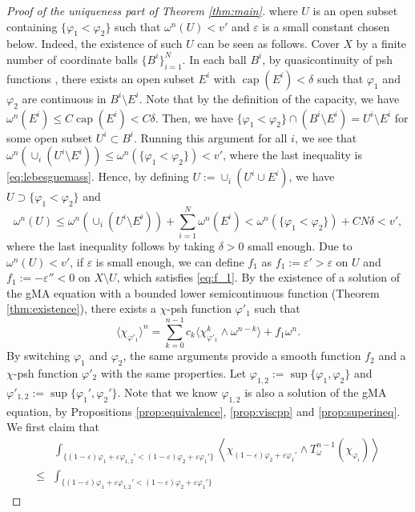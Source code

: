 \documentclass{amsart}
\numberwithin{equation}{section}
\theoremstyle{plain}
\theoremstyle{definition}
\theoremstyle{remark}
\begin{document}
\begin{proof}[Proof of the uniqueness part of Theorem \ref{thm:main}]
    where $U$ is an open subset containing $\{\varphi_1<\varphi_2\}$ such that $\omega^n(U)<v'$ and $\varepsilon$ is a small constant chosen below. Indeed, the existence of such $U$ can be seen as follows. Cover $X$ by a finite number of coordinate balls $\{B^i\}^N_{i=1}$. In each ball $B^i$, by quasicontinuity of psh functions \cite[Theorem 3.5]{BT}, there exists an open subset $E^i$ with $\operatorname{cap}(E^i)<\delta$ such that $\varphi_1$ and $\varphi_2$ are continuous in $B^i\setminus E^i$. Note that by the definition of the capacity, we have $\omega^n(E^i)\le C \operatorname{cap}(E^i)<C\delta$. Then, we have $\{\varphi_1<\varphi_2\}\cap (B^i\setminus E^i)= U^i\setminus E^i$ for some open subset $U^i\subset B^i$. Running this argument for all $i$, we see that $\omega^n(\cup_i (U^i\setminus E^i))\le\omega^n(\{\varphi_1<\varphi_2\})<v'$, where the last inequality is \eqref{eq:lebesguemass}. Hence, by defining $U:=\cup_i (U^i\cup E^i)$, we have $U\supset\{\varphi_1<\varphi_2\}$ and 
    $$\omega^n(U)\le\omega^n(\cup_i (U^i\setminus E^i))+\sum_{i=1}^N\omega^n(E^i)<\omega^n(\{\varphi_1<\varphi_2\})+CN\delta<v',$$
    where the last inequality follows by taking $\delta>0$ small enough. Due to $\omega^n(U)<v'$, if $\varepsilon$ is small enough, we can define $f_1$ as $f_1:=\varepsilon'>\varepsilon$ on $U$ and $f_1:=-\varepsilon''<0$ on $X\setminus U$, which satisfies \eqref{eq:f_1}.
    By the existence of a solution of the gMA equation with a bounded lower semicontinuous function (Theorem \ref{thm:existence}), there exists a $\chi$-psh function $\varphi'_1$ such that
    $$\langle\chi_{\varphi'_1}\rangle^n=\sum_{k=0}^{n-1}c_k\langle\chi_{\varphi'_1}^k\wedge\omega^{n-k}\rangle+f_1\omega^n.$$
    By switching $\varphi_1$ and $\varphi_2$, the same arguments provide a smooth function $f_2$ and a $\chi$-psh function $\varphi'_2$ with the same properties. Let $\varphi_{1,2}:=\sup\{\varphi_1,\varphi_2\}$ and $\varphi'_{1,2}:=\sup\{\varphi_1',\varphi_2'\}$. Note that we know $\varphi_{1,2}$ is also a solution of the gMA equation, by Propositions \ref{prop:equivalence}, \ref{prop:viscpp} and \ref{prop:superineq}.
    We first claim that
    \begin{equation}\label{ineqJcomp}
    \begin{split}
        &\int_{\{(1-\varepsilon)\varphi_1+\varepsilon\varphi_{1,2}'<(1-\varepsilon)\varphi_2+\varepsilon\varphi_1'\}}
        \left\langle\chi_{(1-\varepsilon)\varphi_2+\varepsilon\varphi_1'}\wedge T^{n-1}_\omega(\chi_{\varphi_i})\right\rangle\\
        \le &\int_{\{(1-\varepsilon)\varphi_1+\varepsilon\varphi_{1,2}'<(1-\varepsilon)\varphi_2+\varepsilon\varphi_1'\}}

\end{split}
\end{equation}
\end{proof}
\end{document}

